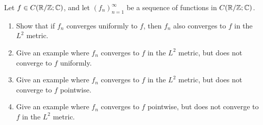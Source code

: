 \begin{ex}\label{ii:ex:5.2.6}
  Let \(f \in C(\mathbb{R} / \mathbb{Z} ; \mathbb{C})\), and let \((f_n)_{n = 1}^\infty\) be a sequence of functions in \(C(\mathbb{R} / \mathbb{Z} ; \mathbb{C})\).
  \begin{enumerate}
    \item\label{ii:ex:5.2.6.a} Show that if \(f_n\) converges uniformly to \(f\), then \(f_n\) also converges to \(f\) in the \(L^2\) metric.
    \item\label{ii:ex:5.2.6.b} Give an example where \(f_n\) converges to \(f\) in the \(L^2\) metric, but does not converge to \(f\) uniformly.
    \item\label{ii:ex:5.2.6.c} Give an example where \(f_n\) converges to \(f\) in the \(L^2\) metric, but does not converge to \(f\) pointwise.
    \item\label{ii:ex:5.2.6.d} Give an example where \(f_n\) converges to \(f\) pointwise, but does not converge to \(f\) in the \(L^2\) metric.
  \end{enumerate}
\end{ex}

